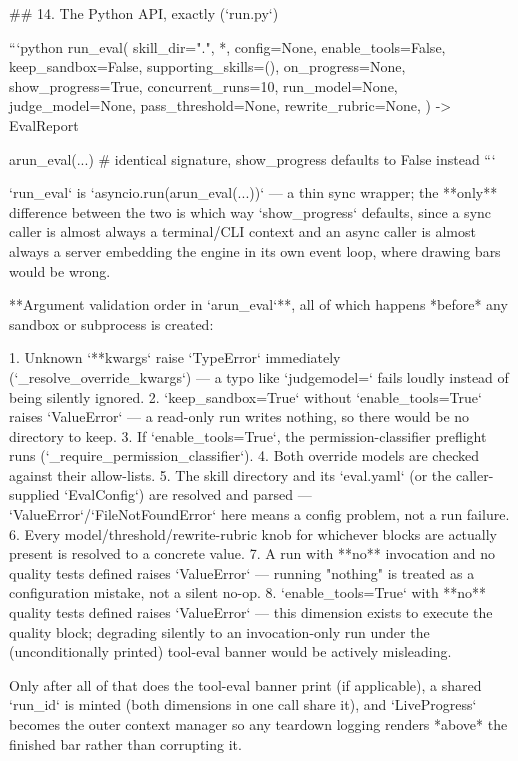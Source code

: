 ## 14. The Python API, exactly (`run.py`)

```python
run_eval(
    skill_dir=".", *, config=None, enable_tools=False, keep_sandbox=False,
    supporting_skills=(), on_progress=None, show_progress=True,
    concurrent_runs=10, run_model=None, judge_model=None,
    pass_threshold=None, rewrite_rubric=None,
) -> EvalReport

arun_eval(...)   # identical signature, show_progress defaults to False instead
```

`run_eval` is `asyncio.run(arun_eval(...))` — a thin sync wrapper; the **only** difference between the two is which way `show_progress` defaults, since a sync caller is almost always a terminal/CLI context and an async caller is almost always a server embedding the engine in its own event loop, where drawing bars would be wrong.

**Argument validation order in `arun_eval`**, all of which happens *before* any sandbox or subprocess is created:

1. Unknown `**kwargs` raise `TypeError` immediately (`_resolve_override_kwargs`) — a typo like `judgemodel=` fails loudly instead of being silently ignored.
2. `keep_sandbox=True` without `enable_tools=True` raises `ValueError` — a read-only run writes nothing, so there would be no directory to keep.
3. If `enable_tools=True`, the permission-classifier preflight runs (`_require_permission_classifier`).
4. Both override models are checked against their allow-lists.
5. The skill directory and its `eval.yaml` (or the caller-supplied `EvalConfig`) are resolved and parsed — `ValueError`/`FileNotFoundError` here means a config problem, not a run failure.
6. Every model/threshold/rewrite-rubric knob for whichever blocks are actually present is resolved to a concrete value.
7. A run with **no** invocation and no quality tests defined raises `ValueError` — running "nothing" is treated as a configuration mistake, not a silent no-op.
8. `enable_tools=True` with **no** quality tests defined raises `ValueError` — this dimension exists to execute the quality block; degrading silently to an invocation-only run under the (unconditionally printed) tool-eval banner would be actively misleading.

Only after all of that does the tool-eval banner print (if applicable), a shared `run_id` is minted (both dimensions in one call share it), and `LiveProgress` becomes the outer context manager so any teardown logging renders *above* the finished bar rather than corrupting it.

